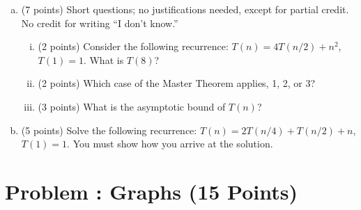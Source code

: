 \documentclass[12pt]{amsart}
\newcounter{pNum}
\newcommand{\problem}[2]{\addtocounter{pNum}{1}
\section*{Problem \arabic{pNum}: #1 (#2 Points)}}
\begin{document}
\begin{enumerate}[(a)]
\item (7 points)
Short questions; no justifications needed, except for partial credit. No credit for writing  ``I don't know.'' 
\begin{enumerate}[(i)] 
\item (2 points)
Consider the following recurrence: $T(n) = 4T(n/2) + n^2$, $T(1) = 1$. What is $T(8)$?

\vfill

\item (2 points)
Which case of the Master Theorem applies, 1, 2, or 3?
\vfill

\item (3 points)
What is the asymptotic bound of $T(n)$?

\vfill

\end{enumerate}

\newpage

\item (5 points)
Solve the following recurrence: $T(n) = 2T(n/4) + T(n/2) + n$, $T(1) = 1$.
You must show how you arrive at the solution.

\end{enumerate}


\newpage

\problem{Graphs}{15}
\end{document}

